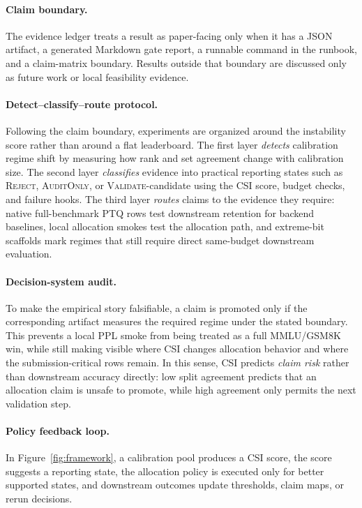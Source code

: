 \documentclass[letterpaper]{article}
\begin{document}
\paragraph{Claim boundary.}
The evidence ledger treats a result as paper-facing only when it has a JSON
artifact, a generated Markdown gate report, a runnable command in the runbook,
and a claim-matrix boundary. Results outside that boundary are discussed only
as future work or local feasibility evidence.

\paragraph{Detect--classify--route protocol.}
Following the claim boundary, experiments are organized around the instability
score rather than around a flat leaderboard. The first layer \emph{detects}
calibration regime shift by measuring how rank and set agreement change with
calibration size. The second layer \emph{classifies} evidence into practical
reporting states such as \textsc{Reject}, \textsc{AuditOnly}, or
\textsc{Validate}-candidate using the CSI score, budget checks, and failure
hooks. The third layer \emph{routes} claims to the evidence they require:
native full-benchmark PTQ rows test downstream retention for backend baselines,
local allocation smokes test the allocation path, and extreme-bit scaffolds mark
regimes that still require direct same-budget downstream evaluation.

\paragraph{Decision-system audit.}
To make the empirical story falsifiable, a claim is promoted only if the
corresponding artifact measures the required regime under the stated boundary.
This prevents a local PPL smoke from being treated as a full MMLU/GSM8K win,
while still making visible where CSI changes allocation behavior and where the
submission-critical rows remain. In this sense, CSI predicts \emph{claim risk}
rather than downstream accuracy directly: low split agreement predicts that an
allocation claim is unsafe to promote, while high agreement only permits the
next validation step.

\paragraph{Policy feedback loop.}
In Figure~\ref{fig:framework}, a calibration pool produces a CSI score, the
score suggests a reporting state, the allocation policy is executed only for
better supported states, and downstream outcomes update thresholds, claim maps,
or rerun decisions.
\end{document}
